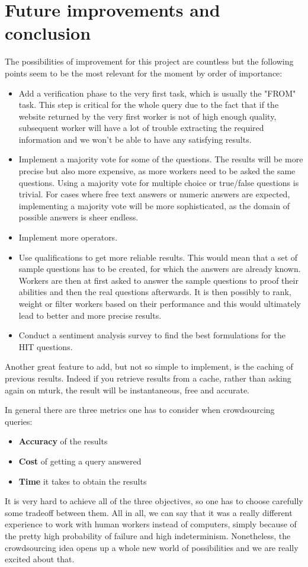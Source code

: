 \documentclass{article}
\begin{document}
\section{Future improvements and conclusion}
The possibilities of improvement for this project are countless but the following points seem to be the most relevant for the moment by order of importance:
\begin{itemize}
\item Add a verification phase to the very first task, which is usually the "FROM" task. This step is critical for the whole query due to the fact that if the website returned by the very first worker is not of high enough quality, subsequent worker will have a lot of trouble extracting the required information and we won't be able to have any satisfying results.
\item Implement a majority vote for some of the questions. The results will be more precise but also more expensive, as more workers need to be asked the same questions. Using a majority vote for multiple choice or true/false questions is trivial. For cases where free text answers or numeric answers are expected, implementing a majority vote will be more sophisticated, as the domain of possible answers is sheer endless.
\item Implement more operators.
\item Use qualifications to get more reliable results. This would mean that a set of sample questions has to be created, for which the answers are already known. Workers are then at first asked to answer the sample questions to proof their abilities and then the real questions afterwards. It is then possibly to rank, weight or filter workers based on their performance and this would ultimately lead to better and more precise results.
\item Conduct a sentiment analysis survey to find the best formulations for the HIT questions.

\end{itemize}
Another great feature to add, but not so simple to implement, is the caching of previous results. Indeed if you retrieve results from a cache, rather than asking again on mturk, the result will be instantaneous, free and accurate.

In general there are three metrics one has to consider when crowdsourcing queries:
\begin{itemize}
\item \textbf{Accuracy} of the results
\item \textbf{Cost} of getting a query answered
\item \textbf{Time} it takes to obtain the results
\end{itemize}
It is very hard to achieve all of the three objectives, so one has to choose carefully some tradeoff between them.
All in all, we can say that it was a really different experience to work with human workers instead of computers, simply because of the pretty high probability of failure and high indeterminism. Nonetheless, the crowdsourcing idea opens up a whole new world of possibilities and we are really excited about that.
\end{document}
